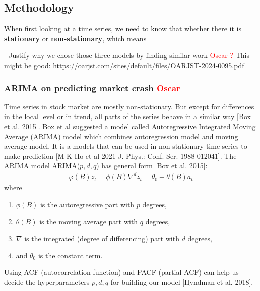 \documentclass[12pt, letterpaper]{article}
\begin{document}





\subsection*{Methodology}
When first looking at a time series, we need to know that whether there it is \textbf{stationary} or \textbf{non-stationary}, which means 

- Justify why we chose those three models by finding similar work \textcolor{red}{Oscar ?} This might be good: https://oarjst.com/sites/default/files/OARJST-2024-0095.pdf
    \subsubsection*{ARIMA on predicting market crash \textcolor{red}{Oscar}}
    Time series in stock market are mostly non-stationary. But except for differences in the local level or in trend, all parts of the series behave in a similar way [Box et al. 2015]. Box et al suggested a model called Autoregressive Integrated Moving Average (ARIMA) model which combines autoregression model and moving average model. It is a models that can be used in non-stationary time series to make prediction [M K Ho et al 2021 J. Phys.: Conf. Ser. 1988 012041].
    The ARIMA model ARIMA($p,d,q$) has general form [Box et al. 2015]:
    \begin{align*}
        \varphi (B) z_t = \phi (B)\nabla^d z_t = \theta_0 + \theta (B)a_t
    \end{align*}
    where
    \begin{enumerate}[label=\arabic*.]
        \item $\phi(B)$ is the autoregressive part with $p$ degrees,
        \item $\theta (B)$ is the moving average part with $q$ degrees,
        \item $\nabla$ is the integrated (degree of differencing) part with $d$ degrees,
        \item and $\theta_0$ is the constant term.
    \end{enumerate}
    Using ACF (autocorrelation function) and PACF (partial ACF) can help us decide the hyperparameters $p, d, q$ for building our model [Hyndman et al. 2018].
\end{document}
